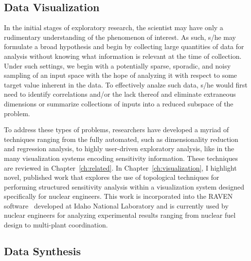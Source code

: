 \subsection{Data Visualization}

In the initial stages of exploratory research, the scientist may have only a rudimentary understanding of the phenomenon of interest.
%
As such, s/he may formulate a broad hypothesis and begin by collecting large quantities of data for analysis without knowing what information is relevant at the time of collection.
%
Under such settings, we begin with a potentially sparse, sporadic, and noisy sampling of an input space with the hope of analyzing it with respect to some target value inherent in the data.
%
To effectively analze such data, s/he would first need to identify correlations and/or the lack thereof and eliminate extraneous dimensions or summarize collections of inputs into a reduced subspace of the problem.

To address these types of problems, researchers have developed a myriad of techniques ranging from the fully automated, such as dimensionality reduction and regression analysis, to highly user-driven exploratory analysis, like in the many visualization systems encoding sensitivity information.
%
These techniques are reviewed in Chapter~\ref{ch:related}.
%
In Chapter~\ref{ch:visualization}, I highlight novel, published work that explores the use of topological techniques for performing structured sensitivity analysis within a visualization system designed specifically for nuclear engineers.
%
This work is incorporated into the RAVEN software~\cite{RabitiAlfonsiCogliati2015} developed at Idaho National Laboratory and is currently used by nuclear engineers for analyzing experimental results ranging from nuclear fuel design to multi-plant coordination.

\subsection{Data Synthesis}

